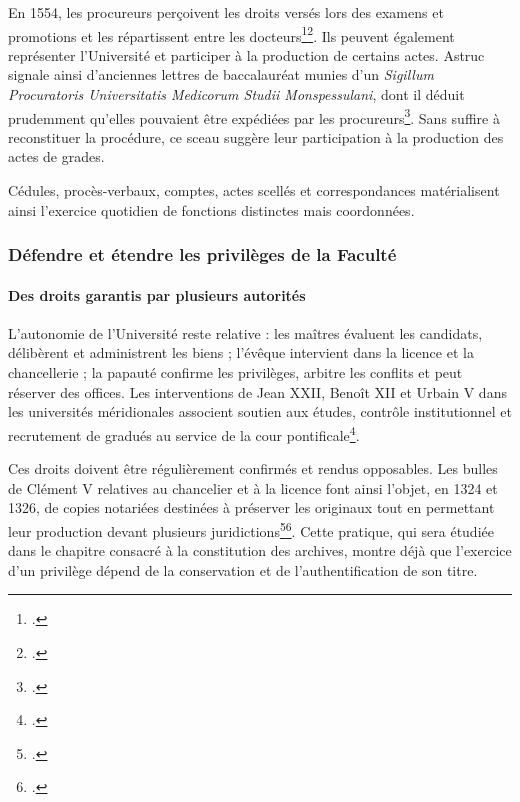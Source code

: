 En 1554, les procureurs perçoivent les droits versés lors des examens et promotions et les répartissent entre les docteurs\footcite[fol.~160v--164v]{AHFMS1}\footcite[p.~126--129]{Astruc1767}. Ils peuvent également représenter l'Université et participer à la production de certains actes. Astruc signale ainsi d'anciennes lettres de baccalauréat munies d'un \emph{Sigillum Procuratoris Universitatis Medicorum Studii Monspessulani}, dont il déduit prudemment qu'elles pouvaient être expédiées par les procureurs\footcite[p.~89]{Astruc1767}. Sans suffire à reconstituer la procédure, ce sceau suggère leur participation à la production des actes de grades.

Cédules, procès-verbaux, comptes, actes scellés et correspondances matérialisent ainsi l'exercice quotidien de fonctions distinctes mais coordonnées.

\subsubsection{Défendre et étendre les privilèges de la Faculté}

\paragraph{Des droits garantis par plusieurs autorités}

L'autonomie de l'Université reste relative : les maîtres évaluent les candidats, délibèrent et administrent les biens ; l'évêque intervient dans la licence et la chancellerie ; la papauté confirme les privilèges, arbitre les conflits et peut réserver des offices. Les interventions de Jean XXII, Benoît XII et Urbain V dans les universités méridionales associent soutien aux études, contrôle institutionnel et recrutement de gradués au service de la cour pontificale\footcite{Verger1991UniversitesMidi}.

Ces droits doivent être régulièrement confirmés et rendus opposables. Les bulles de Clément V relatives au chancelier et à la licence font ainsi l'objet, en 1324 et 1326, de copies notariées destinées à préserver les originaux tout en permettant leur production devant plusieurs juridictions\footcite{ConfirmationChancelier1324}\footcite{ConfirmationLicence1326}. Cette pratique, qui sera étudiée dans le chapitre consacré à la constitution des archives, montre déjà que l'exercice d'un privilège dépend de la conservation et de l'authentification de son titre.

